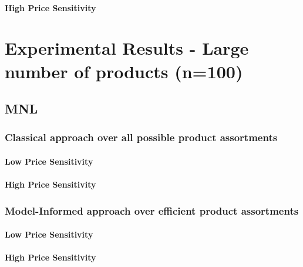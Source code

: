 

\paragraph{High Price Sensitivity}



\section{Experimental Results - Large number of products (n=100)}

\subsection{MNL}

\subsubsection{Classical approach over all possible product assortments}

\paragraph{Low Price Sensitivity}



\paragraph{High Price Sensitivity}



\subsubsection{Model-Informed approach over efficient product assortments}

\paragraph{Low Price Sensitivity}



\paragraph{High Price Sensitivity}

